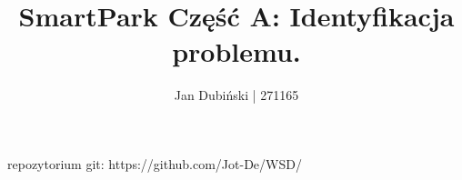 \documentclass[
    left=2.5cm,         %
    right=2.5cm,        %
    top=2.5cm,          %
    bottom=3cm,         %
    bindingoffset=6mm,  %
    nohyphenation=false %
]{eiti/eiti-thesis}
\begin{document}
\MasterThesis %
\title{
    SmartPark
    \break
    Część A: Identyfikacja problemu.
}
\subject{Wieloagentowe Systemy Decyzyjne}
\author{Jan Dubiński | 271165}
\date{\the\year}
\maketitle

repozytorium git:  https://github.com/Jot-De/WSD/

\hfill \break

\thispagestyle{empty}
\tableofcontents




\clearpage
\newpage


\printbibliography

\newpage


\listoffigures              %
\vspace{1cm}                %





\end{document}
